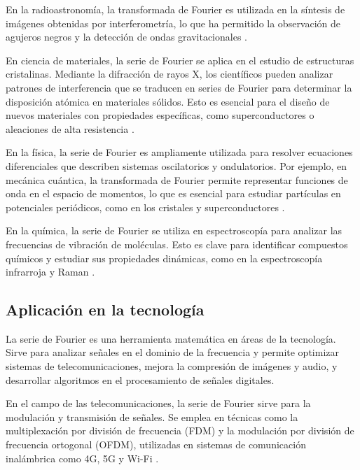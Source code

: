 {En la radioastronomía, la transformada de Fourier es utilizada en la síntesis de imágenes obtenidas por interferometría, lo que ha permitido la observación de agujeros negros y la detección de ondas gravitacionales \cite{thompson2017interferometry}.
\vspace{10pt}

En ciencia de materiales, la serie de Fourier se aplica en el estudio de estructuras cristalinas. Mediante la difracción de rayos X, los científicos pueden analizar patrones de interferencia que se traducen en series de Fourier para determinar la disposición atómica en materiales sólidos. Esto es esencial para el diseño de nuevos materiales con propiedades específicas, como superconductores o aleaciones de alta resistencia \cite{cullity2014elements}.

En la física, la serie de Fourier es ampliamente utilizada para resolver ecuaciones diferenciales que describen sistemas oscilatorios y ondulatorios. Por ejemplo, en mecánica cuántica, la transformada de Fourier permite representar funciones de onda en el espacio de momentos, lo que es esencial para estudiar partículas en potenciales periódicos, como en los cristales y superconductores \cite{griffiths2018introduction}.
\vspace{10pt}

En la química, la serie de Fourier se utiliza en espectroscopía para analizar las frecuencias de vibración de moléculas. Esto es clave para identificar compuestos químicos y estudiar sus propiedades dinámicas, como en la espectroscopía infrarroja y Raman \cite{banwell1994fundamentals}.


\subsection{Aplicación en la tecnología}

La serie de Fourier es una herramienta matemática en áreas de la tecnología. Sirve para analizar señales en el dominio de la frecuencia y permite optimizar sistemas de telecomunicaciones, mejora la compresión de imágenes y audio, y desarrollar algoritmos en el procesamiento de señales digitales. 
\vspace{10pt}

En el campo de las telecomunicaciones, la serie de Fourier sirve para la modulación y transmisión de señales. Se emplea en técnicas como la multiplexación por división de frecuencia (FDM) y la modulación por división de frecuencia ortogonal (OFDM), utilizadas en sistemas de comunicación inalámbrica como 4G, 5G y Wi-Fi \cite{proakis2001digital}.
\vspace{10pt}

}
